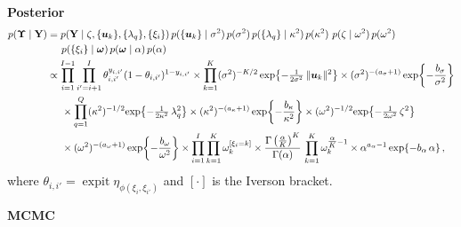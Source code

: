 \documentclass[letterpaper,12pt,openany]{article}
\def\exp#1{{\rm exp}{#1}}
\def\frac#1#2{{{#1}\over{#2}}}
\DeclareMathOperator*{\expit}{expit}
\newcommand{\ex}[1]{\exp{ \left\{ #1 \right\}}}
\def\Y{\mathbf{Y}}\def\y{\mathbf{y}}\def\Yv{\boldsymbol{Y}}\def\yv{\boldsymbol{y}}
\def\al{\alpha}\def\alv{\boldsymbol{\alpha}}
\def\sig{\sigma}\def\sigv{\boldsymbol{\sigma}}
\def\ome{\omega}
\def\kap{\kappa}
\begin{document}
\textbf{Posterior}
\begin{align*}
p(\UPS\mid\Y) &= p(\Y\mid\zeta, \{\uv_k\},\{\lambda_q \}, \{\xi_i \} )\,
p(\{\uv_k\}\mid\sigma^2)\,p(\sigma^2) \, p(\{\lambda_q\}\mid \kappa^2)\,p(\kap^2)\, \,p(\zeta\mid\omega^2)\,p(\omega^2)\, \\ &\hspace{0.5cm}p(\{\xi_i\}\mid\omev)\,p(\omev\mid\alpha)\,p(\alpha) \\
&\propto\prod_{i=1}^{I-1}\prod_{i'=i+1}^I \theta_{i,i'}^{y_{i,i'}}(1-\theta_{i,i'})^{1-y_{i,i'}} \times 
\prod_{k=1}^K (\sig^2)^{-K/2}\,\ex{-\tfrac{1}{2\sig^2}\,\|\uv_k\|^2} \times(\sig^2)^{-(a_\sig+1)}\,\ex{-\frac{b_\sig}{\sig^2}} \\
&\hspace{0.5cm} \times \prod_{q=1}^Q (\kap^2)^{-1/2} \ex{-\tfrac{1}{2\kap^2}\,\lambda_q^2}\times(\kap^2)^{-(a_\kap+1)}\,\ex{-\frac{b_\kap}{\kap^2}}
\times (\ome^2)^{-1/2} \ex{-\tfrac{1}{2\ome^2}\,\zeta^2}  \\ &\hspace{0.5cm} \times (\ome^2)^{-(a_\ome+1)}\,\ex{-\frac{b_\ome}{\ome^2}}	
\times \prod_{i=1}^I\prod_{k=1}^K\omega_k^{[\xi_i=k]} \times \frac{\Gamma\left(\tfrac{\al}{K}\right)^K}{\Gamma(\alpha)}\,\prod_{k=1}^K \ome_k^{\tfrac{\al}{K}-1} \times \alpha^{a_\al-1}\,\ex{-b_\al\,\al}\,,
\end{align*}
where $\theta_{i,i'}=\expit\eta_{\phi(\xi_i,\xi_{i'})}$ and $[\cdot]$ is the Iverson bracket.

\textbf{MCMC}
\end{document}
